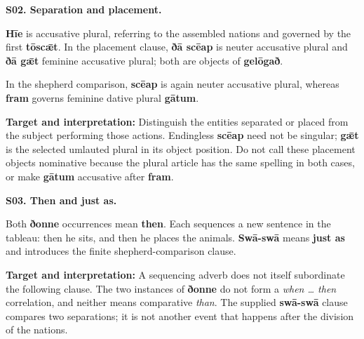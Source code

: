 \par\begin{minipage}{\linewidth}\raggedright
\textbf{S02. Separation and placement.}

\textbf{Hīe} is accusative plural, referring to the assembled nations and governed by the first \textbf{tōscǣt}. In the placement clause, \textbf{ðā scēap} is neuter accusative plural and \textbf{ðā gǣt} feminine accusative plural; both are objects of \textbf{gelōgað}.

In the shepherd comparison, \textbf{scēap} is again neuter accusative plural, whereas \textbf{fram} governs feminine dative plural \textbf{gātum}.

\textbf{Target and interpretation:} Distinguish the entities separated or placed from the subject performing those actions. Endingless \textbf{scēap} need not be singular; \textbf{gǣt} is the selected umlauted plural in its object position. Do not call these placement objects nominative because the plural article has the same spelling in both cases, or make \textbf{gātum} accusative after \textbf{fram}.

\end{minipage}\par\addvspace{4pt}

\par\begin{minipage}{\linewidth}\raggedright
\textbf{S03. Then and just as.}

Both \textbf{ðonne} occurrences mean \textbf{then}. Each sequences a new sentence in the tableau: then he sits, and then he places the animals. \textbf{Swā-swā} means \textbf{just as} and introduces the finite shepherd-comparison clause.

\textbf{Target and interpretation:} A sequencing adverb does not itself subordinate the following clause. The two instances of \textbf{ðonne} do not form a \emph{when … then} correlation, and neither means comparative \emph{than}. The supplied \textbf{swā-swā} clause compares two separations; it is not another event that happens after the division of the nations.

\end{minipage}\par\addvspace{4pt}

